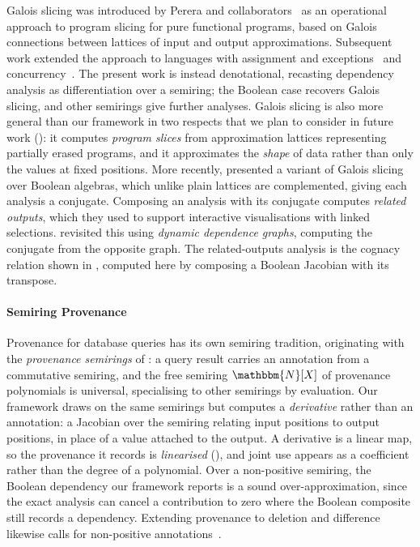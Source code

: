 Galois slicing was introduced by Perera and collaborators~\cite{perera12a,perera13} as an operational approach
to program slicing for pure functional programs, based on Galois connections between lattices of input and
output approximations.  Subsequent work extended
the approach to languages with assignment and exceptions~\cite{ricciotti17} and
concurrency~\cite{perera16d}.
 The present work is instead denotational, recasting dependency analysis as
differentiation over a semiring; the Boolean case recovers Galois slicing, and other semirings give further
analyses. Galois slicing is also more general than our framework in two respects that we plan to consider in
future work (): it computes \emph{program slices} from approximation lattices representing
partially erased programs, and it approximates the \emph{shape} of data rather than only the values at fixed
positions. More recently, \citet{perera22} presented a variant of Galois slicing
over Boolean algebras, which unlike plain lattices are complemented, giving each analysis a
conjugate. Composing an analysis with its conjugate computes
\emph{related outputs}, which they used to support interactive visualisations with linked selections.
\citet{bond25} revisited this using \emph{dynamic dependence graphs}, computing the conjugate from the
opposite graph. The related-outputs analysis is
the cognacy relation shown in , computed here by composing a Boolean Jacobian with its
transpose.

\paragraph{Semiring Provenance}

Provenance for database queries has its own semiring tradition, originating with the \emph{provenance
semirings} of \citet{green07}: a query result carries an annotation from a commutative semiring, and the free
semiring $\mathbbm{N}[X]$ of provenance polynomials is universal, specialising to other semirings by
evaluation. Our framework draws on the same semirings but computes a \emph{derivative} rather than an
annotation: a Jacobian over the semiring relating input positions to output positions, in place of a value
attached to the output. A derivative is a linear map, so the provenance it records is \emph{linearised}
(), and joint use appears as a coefficient rather than the
degree of a polynomial. Over a non-positive semiring, the Boolean dependency our framework reports is a sound
over-approximation, since the exact analysis can cancel a contribution to zero where the Boolean composite
still records a dependency. Extending provenance to deletion and difference likewise calls for non-positive
annotations~\cite{green09,amsterdamer11,geerts10}.


